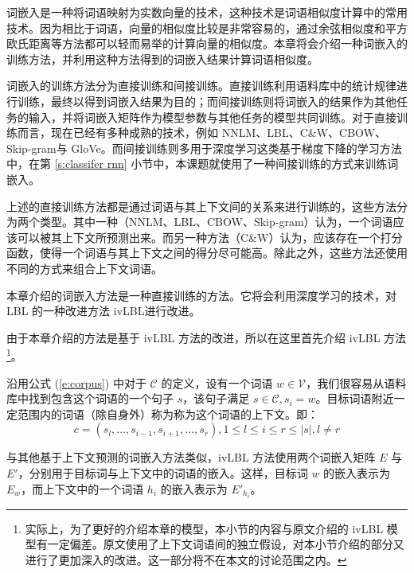
词嵌入是一种将词语映射为实数向量的技术，这种技术是词语相似度计算中的常用技术。因为相比于词语，向量的相似度比较是非常容易的，通过余弦相似度和平方欧氏距离等方法都可以轻而易举的计算向量的相似度。本章将会介绍一种词嵌入的训练方法，并利用这种方法得到的词嵌入结果计算词语相似度。

词嵌入的训练方法分为直接训练和间接训练。直接训练利用语料库中的统计规律进行训练，最终以得到词嵌入结果为目的；而间接训练则将词嵌入的结果作为其他任务的输入，并将词嵌入矩阵作为模型参数与其他任务的模型共同训练。对于直接训练而言，现在已经有多种成熟的技术，例如 NNLM、LBL、C\&W、CBOW、Skip-gram与 GloVe。而间接训练则多用于深度学习这类基于梯度下降的学习方法中，在第 \ref{s:classifer rnn} 小节中，本课题就使用了一种间接训练的方式来训练词嵌入。

上述的直接训练方法都是通过词语与其上下文间的关系来进行训练的，这些方法分为两个类型。其中一种（NNLM、LBL、CBOW、Skip-gram）认为，一个词语应该可以被其上下文所预测出来。而另一种方法（C\&W）认为，应该存在一个打分函数，使得一个词语与其上下文之间的得分尽可能高。除此之外，这些方法还使用不同的方式来组合上下文词语。

本章介绍的词嵌入方法是一种直接训练的方法。它将会利用深度学习的技术，对 LBL 的一种改进方法 ivLBL进行改进。

\label{s:ivlbl}
由于本章介绍的方法是基于 ivLBL 方法的改进，所以在这里首先介绍 ivLBL 方法\footnote{实际上，为了更好的介绍本章的模型，本小节的内容与原文介绍的 ivLBL 模型有一定偏差。原文使用了上下文词语间的独立假设，对本小节介绍的部分又进行了更加深入的改进。这一部分将不在本文的讨论范围之内。}。

沿用公式 (\ref{e:corpus}) 中对于 $\mathcal{C}$ 的定义，设有一个词语 $w \in \mathcal{V}$，我们很容易从语料库中找到包含这个词语的一个句子 $s$，该句子满足 $s \in \mathcal{C}, s_i = w$。目标词语附近一定范围内的词语（除自身外）称为称为这个词语的上下文。即：
\begin{equation}
c = (s_l, \dots, s_{i - 1}, s_{i + 1}, \dots, s_r), 1 \leq l \leq i \leq r \leq |s|, l \neq r
\end{equation}

与其他基于上下文预测的词嵌入方法类似，ivLBL 方法使用两个词嵌入矩阵 $E$ 与 $E'$，分别用于目标词与上下文中的词语的嵌入。这样，目标词 $w$ 的嵌入表示为 $E_w$，而上下文中的一个词语 $h_i$ 的嵌入表示为 $E'_{h_i}$。

